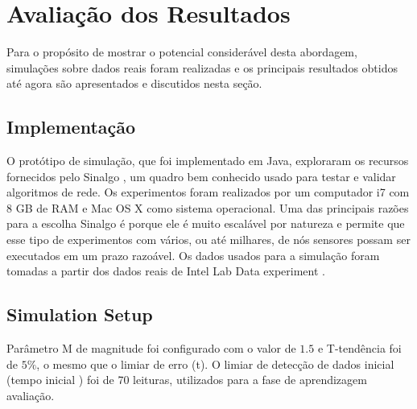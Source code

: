 \documentclass{acm_proc_article-sp}
\begin{document}
\section{Avaliação dos Resultados}
\label{eval}

Para o propósito de mostrar o potencial considerável desta abordagem,
simulações sobre dados reais foram realizadas e os principais resultados 
obtidos até agora são apresentados e discutidos nesta seção.

\subsection{Implementação}
\label{implementation}

O protótipo de simulação, que foi implementado em Java, exploraram os
recursos fornecidos pelo Sinalgo \cite{Sinalgo2007}, um quadro bem
conhecido usado para testar e validar algoritmos de rede. Os experimentos 
foram realizados por um computador i7 com 8 GB de RAM e Mac OS X como
sistema operacional. {Uma das principais razões para a escolha
Sinalgo é porque ele é muito escalável por natureza e permite que 
esse tipo de experimentos com vários, ou até milhares, de nós
sensores possam ser executados em um prazo razoável.}
Os dados usados para a simulação foram tomadas a partir dos dados
reais de Intel Lab Data experiment \cite{Intel2004}.

\subsection{Simulation Setup}
\label{data-and-experiments}

Parâmetro M de magnitude foi configurado com o valor de $1.5$ e
T-tendência foi de $5\%$, o mesmo que o limiar de erro (t).
O limiar de detecção de dados inicial (tempo inicial ) foi de 70 leituras,
utilizados para a fase de aprendizagem avaliação.
\vspace*{-.3cm}
\end{document}
